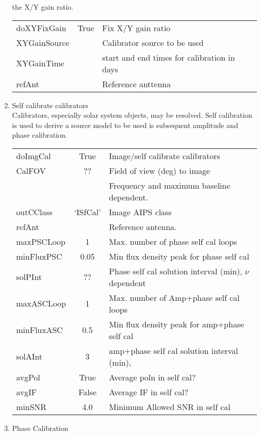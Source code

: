 \documentclass[11pt]{article}
\begin{document}
\begin{enumerate}
the X/Y gain ratio.
\begin{center}
\begin{tabular}{|l|c|l|}
\hline
doXYFixGain   & True &  Fix X/Y gain ratio\\
XYGainSource  &  & Calibrator source to be used \\
XYGainTime &  & start and end times for calibration in days \\
refAnt     &  & Reference anttenna\\
\hline
\end{tabular}
\end{center}
%
\item Self calibrate calibrators \\
Calibrators, especially solar system objects, may be resolved.
Self calibration is used to derive a source model to be used is
subsequent amplitude and phase calibration.
\begin{center}
\begin{tabular}{|l|c|l|}
\hline
doImgCal  & True &  Image/self calibrate calibrators\\
CalFOV    & ??   & Field of view (deg) to image \\
          &      & Frequency and maximum baseline dependent.\\
outCClass & `ISfCal' &  Image AIPS class \\
refAnt      &  & Reference antenna. \\
maxPSCLoop  & 1        & Max. number of phase self cal loops\\
minFluxPSC  & 0.05     & Min flux density peak for phase self cal\\
solPInt     &   ??     & Phase self cal solution interval (min), $\nu$ dependent \\
maxASCLoop  & 1        & Max. number of Amp+phase self cal loops\\
minFluxASC  & 0.5      & Min flux density peak for amp+phase self cal\\
solAInt     &    3     & amp+phase self cal solution interval (min), \\
avgPol      & True     & Average poln in self cal?\\
avgIF       & False    & Average IF in self cal?\\
minSNR      & 4.0      & Minimum Allowed SNR in self cal\\
\hline
\end{tabular}
\end{center}
%
\item Phase Calibration \\

\end{enumerate}
\end{document}
